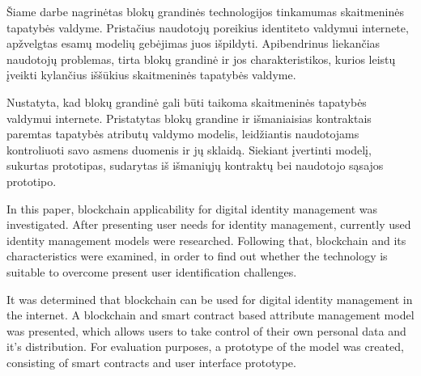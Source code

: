 
Šiame darbe nagrinėtas blokų grandinės technologijos tinkamumas skaitmeninės tapatybės valdyme. Pristačius naudotojų poreikius identiteto valdymui internete,
apžvelgtas esamų modelių gebėjimas juos išpildyti. Apibendrinus liekančias naudotojų problemas, tirta blokų grandinė ir jos charakteristikos,
kurios leistų įveikti kylančius iššūkius skaitmeninės tapatybės valdyme.

Nustatyta, kad blokų grandinė gali būti taikoma skaitmeninės tapatybės valdymui internete. Pristatytas blokų grandine ir išmaniaisias kontraktais
paremtas tapatybės atributų valdymo modelis,
leidžiantis naudotojams kontroliuoti savo asmens duomenis ir jų sklaidą. Siekiant įvertinti modelį,
sukurtas prototipas, sudarytas iš išmaniųjų kontraktų bei naudotojo sąsajos prototipo.



In this paper, blockchain applicability for digital identity management was investigated. After presenting user needs for identity management,
currently used identity management models were researched. Following that, blockchain and its characteristics were examined,
in order to find out whether the technology is suitable
to overcome present user identification challenges.

It was determined that blockchain can be used for digital identity management in the internet. A blockchain and smart contract based attribute management model was presented,
which allows users to take control of their own personal data and it's distribution. For evaluation purposes,
a prototype of the model was created, consisting of smart contracts and user interface prototype.

